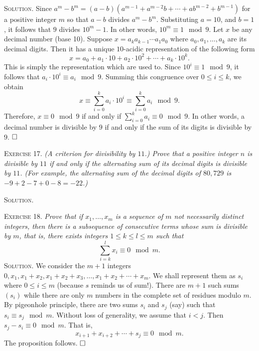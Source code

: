 \documentclass[11pt, leqno]{article}
\newcommand{\done}{\ensuremath{\hfill\square}}
\begin{document}
\textsc{Solution}. Since $a^m - b^m = (a-b)(a^{m-1} + a^{m-2}b + \cdots + ab^{m-2} + b^{m-1})$ for a positive integer $m$ so that $a - b$ divides $a^m - b^m$. Substituting $a = 10$, and $b = 1$, it follows that $9$ divides $10^m-1$. In other words, $10^m \equiv 1 \mod 9$. Let $x$ be any decimal number (base 10). Suppose $x = a_ka_{k-1}\cdots a_1a_0$ where $a_0, a_1, \ldots, a_k$ are its decimal digits. Then it has a unique $10$-acidic representation of the following form 
\begin{displaymath}
x = a_0 + a_1\cdot 10 + a_2 \cdot 10^2 + \cdots + a_k \cdot 10^k.
\end{displaymath}
This is simply the representation which are used to. Since $10^i \equiv 1 \mod 9$, it follows that $a_i \cdot 10^i \equiv a_i \mod 9$. Summing this congruence over $0\leq i \leq k$, we obtain 
\begin{displaymath}
x \equiv \sum_{i=0}^k a_i\cdot 10^i \equiv \sum_{i=0}^k a_i \mod 9.
\end{displaymath}
Therefore, $x \equiv 0 \mod 9$ if and only if $\sum_{i=0}^k a_i \equiv 0 \mod 9$. In other words, a decimal number is divisible by $9$ if and only if the sum of its digits is divisible by $9$. \done

\textsc{Exercise 17}. \emph{(A criterion for divisibility by $11$.) Prove that a positive integer $n$ is divisible by $11$ if and only if the alternating sum of its decimal digits is divisible by $11$. (For example, the alternating sum of the decimal digits of $80,729$ is $-9 + 2 -7 + 0 -8 = -22$.)}

\textsc{Solution}.

\textsc{Exercise 18}. \emph{Prove that if $x_1, \ldots, x_m$ is a sequence of $m$ not necessarily distinct integers, then there is a subsequence of consecutive terms whose sum is divisible by $m$, that is, there exists integers $1 \leq k \leq l \leq m$ such that 
\begin{displaymath}
\sum_{i=k}^l x_i \equiv 0 \mod m.
\end{displaymath}}\textsc{Solution}. We consider the $m+1$ integers $0, x_1, x_1+x_2, x_1+x_2+x_3, \ldots, x_1+x_2+\cdots + x_m$. We shall represent them as $s_i$ where $0 \leq i \leq m$ (because $s$ reminds us of sum!). There are $m+1$ such sums $(s_i)$ while there are only $m$ numbers in the complete set of residues modulo $m$. By pigeonhole principle, there are two sums $s_i$ and $s_j$ (say) such that $s_i \equiv s_j \mod m$. Without loss of generality, we assume that $i < j$. Then $s_j - s_i \equiv 0 \mod m$. That is, 
\begin{displaymath}
x_{i+1} + x_{i+2} + \cdots + s_j \equiv 0 \mod m.
\end{displaymath}
The proposition follows. \done
\end{document}

